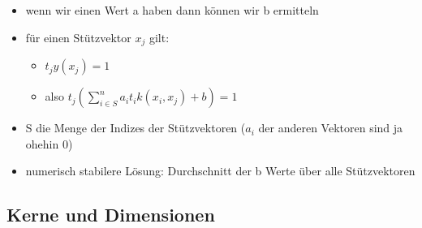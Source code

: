 \documentclass{article} %
\begin{document}
\begin{itemize}
		\item wenn wir einen Wert a haben dann können wir b ermitteln
		\item für einen Stützvektor $x_j$ gilt:
		\begin{itemize}
			\item $t_jy(x_j) = 1$
			\item also $t_j(\sum_{i \in S}^{n}a_it_ik(x_i,x_j)+b) = 1$
		\end{itemize}
		\item S die Menge der Indizes der Stützvektoren ($a_i$ der anderen Vektoren sind ja ohehin 0)
		\item numerisch stabilere Lösung: Durchschnitt der b Werte über alle Stützvektoren
	\end{itemize}
	\subsection{Kerne und Dimensionen}
\end{document}
